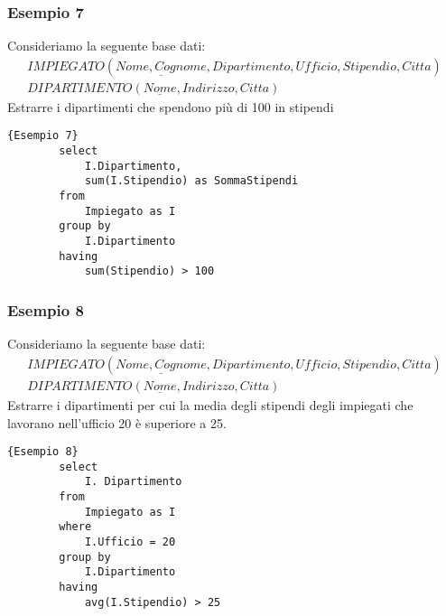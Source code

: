 \subsubsection{Esempio 7}
Consideriamo la seguente base dati:
	\begin{equation}\begin{aligned}
		IMPIEGATO (\underline{Nome, Cognome}, Dipartimento, Ufficio, Stipendio, Citta)\\
		DIPARTIMENTO (\underline{Nome}, Indirizzo, Citta)
	\end{aligned}\end{equation}
Estrarre i dipartimenti che spendono più di 100 in stipendi
	\begin{lstlisting}{Esempio 7}
		select
			I.Dipartimento,
			sum(I.Stipendio) as SommaStipendi
		from
			Impiegato as I
		group by
			I.Dipartimento
		having
			sum(Stipendio) > 100
	\end{lstlisting}
	
\subsubsection{Esempio 8}
Consideriamo la seguente base dati:
	\begin{equation}\begin{aligned}
		IMPIEGATO (\underline{Nome, Cognome}, Dipartimento, Ufficio, Stipendio, Citta)\\
		DIPARTIMENTO (\underline{Nome}, Indirizzo, Citta)
	\end{aligned}\end{equation}
Estrarre i dipartimenti per cui la media degli stipendi degli impiegati che lavorano nell'ufficio 20 è superiore a 25.
	\begin{lstlisting}{Esempio 8}
		select	
			I. Dipartimento
		from
			Impiegato as I
		where
			I.Ufficio = 20
		group by 
			I.Dipartimento
		having
			avg(I.Stipendio) > 25
	\end{lstlisting}

	

